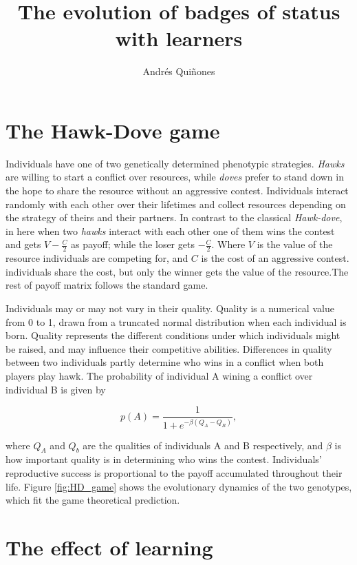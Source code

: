 \documentclass[
]{article}
\title{The evolution of badges of status with learners}
\author{Andrés Quiñones}
\date{}
\begin{document}
\maketitle

\hypertarget{the-hawk-dove-game}{%
\section{The Hawk-Dove game}\label{the-hawk-dove-game}}

Individuals have one of two genetically determined phenotypic
strategies. \emph{Hawks} are willing to start a conflict over resources,
while \emph{doves} prefer to stand down in the hope to share the
resource without an aggressive contest. Individuals interact randomly
with each other over their lifetimes and collect resources depending on
the strategy of theirs and their partners. In contrast to the classical
\emph{Hawk-dove}, in here when two \emph{hawks} interact with each other
one of them wins the contest and gets \(V-\frac{C}{2}\) as payoff; while
the loser gets \(-\frac{C}{2}\). Where \(V\) is the value of the
resource individuals are competing for, and \(C\) is the cost of an
aggressive contest. individuals share the cost, but only the winner gets
the value of the resource.The rest of payoff matrix follows the standard
game.

Individuals may or may not vary in their quality. Quality is a numerical
value from 0 to 1, drawn from a truncated normal distribution when each
individual is born. Quality represents the different conditions under
which individuals might be raised, and may influence their competitive
abilities. Differences in quality between two individuals partly
determine who wins in a conflict when both players play hawk. The
probability of individual A wining a conflict over individual B is given
by

\begin{equation}
p(A)=\frac{1}{1+e^{-\beta(Q_A-Q_B)}},
\end{equation}

where \(Q_A\) and \(Q_b\) are the qualities of individuals A and B
respectively, and \(\beta\) is how important quality is in determining
who wins the contest. Individuals' reproductive success is proportional
to the payoff accumulated throughout their life. Figure
\ref{fig:HD_game} shows the evolutionary dynamics of the two genotypes,
which fit the game theoretical prediction.

\hypertarget{the-effect-of-learning}{%
\section{The effect of learning}\label{the-effect-of-learning}}
\end{document}
